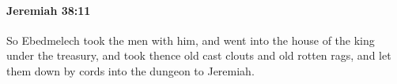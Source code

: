 
		\paragraph{Jeremiah 38:11} %
			\label{JEREMIAH-38-11}

			So Ebedmelech took the men with him, and went into the house of the king under the treasury, and took thence old cast clouts and old rotten rags, and let them down by cords into the dungeon to Jeremiah.


